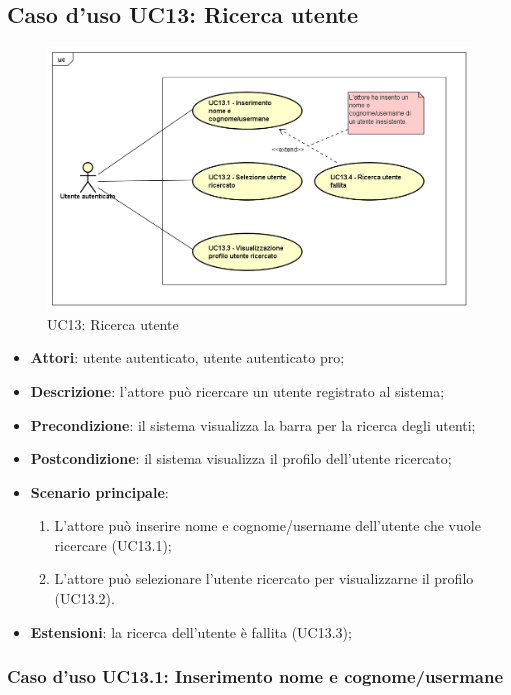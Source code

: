 \newpage
\subsection{Caso d'uso UC13: Ricerca utente}
\label{UC13}
\begin{figure}[ht]
	\centering
	\includegraphics[scale=0.5]{UML/UC13.png}
	\caption{UC13: Ricerca utente}
\end{figure}
\FloatBarrier
\begin{itemize}
	\item \textbf{Attori}: utente autenticato, utente autenticato pro;
	\item \textbf{Descrizione}: l'attore può ricercare un utente registrato al sistema;
	\item \textbf{Precondizione}: il sistema visualizza la barra per la ricerca degli utenti;
	\item \textbf{Postcondizione}: il sistema visualizza il profilo dell'utente ricercato;
	\item \textbf{Scenario principale}:
	\begin{enumerate}
		\item L'attore può inserire nome e cognome/username dell'utente che vuole ricercare (UC13.1);
		\item L'attore può selezionare l'utente ricercato per visualizzarne il profilo (UC13.2).
	\end{enumerate} 
	\item \textbf{Estensioni}: la ricerca dell'utente è fallita (UC13.3);
\end{itemize}

\subsubsection{Caso d'uso UC13.1: Inserimento nome e cognome/usermane}

